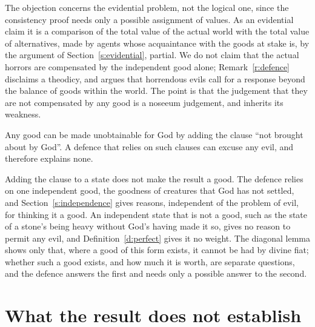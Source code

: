 \documentclass{situationist-preprint}
\begin{document}
\begin{reply}
The objection concerns the evidential problem, not the logical one, since the consistency proof needs only a possible assignment of values. As an evidential claim it is a comparison of the total value of the actual world with the total value of alternatives, made by agents whose acquaintance with the goods at stake is, by the argument of Section~\ref{s:evidential}, partial. We do not claim that the actual horrors are compensated by the independent good alone; Remark~\ref{r:defence} disclaims a theodicy, and \citet{Adams1999} argues that horrendous evils call for a response beyond the balance of goods within the world. The point is that the judgement that they are not compensated by any good is a noseeum judgement, and inherits its weakness.
\end{reply}

\begin{objection}
Any good can be made unobtainable for God by adding the clause \enquote{not brought about by God}. A defence that relies on such clauses can excuse any evil, and therefore explains none.
\end{objection}

\begin{reply}
Adding the clause to a state does not make the result a good. The defence relies on one independent good, the goodness of creatures that God has not settled, and Section~\ref{s:independence} gives reasons, independent of the problem of evil, for thinking it a good. An independent state that is not a good, such as the state of a stone's being heavy without God's having made it so, gives no reason to permit any evil, and Definition~\ref{d:perfect} gives it no weight. The diagonal lemma shows only that, where a good of this form exists, it cannot be had by divine fiat; whether such a good exists, and how much it is worth, are separate questions, and the defence answers the first and needs only a possible answer to the second.
\end{reply}

\section{What the result does not establish}\label{s:not}
\end{document}
